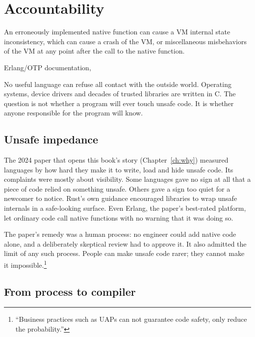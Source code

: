 \chapter{Accountability}
\label{ch:danger}

\epigraph{An erroneously implemented native function can cause a VM internal
state inconsistency, which can cause a crash of the VM, or miscellaneous
misbehaviors of the VM at any point after the call to the native function.}
{Erlang/OTP documentation, }

No useful language can refuse all contact with the outside world. Operating
systems, device drivers and decades of trusted libraries are written in C. The
question is not whether a program will ever touch unsafe code. It is whether
anyone responsible for the program will know.

\section{Unsafe impedance}

The 2024 paper that opens this book's story (Chapter~\ref{ch:why}) measured
languages by how hard they make it to write, load and hide unsafe code. Its
complaints were mostly about visibility. Some languages gave no sign at all
that a piece of code relied on something unsafe. Others gave a sign too quiet
for a newcomer to notice. Rust's own guidance encouraged libraries to wrap
unsafe internals in a safe-looking surface. Even Erlang, the paper's
best-rated platform, let ordinary code call native functions with no warning
that it was doing so.

The paper's remedy was a human process: no engineer could add native code
alone, and a deliberately skeptical review had to approve it. It also admitted
the limit of any such process. People can make unsafe code rarer; they cannot
make it impossible.\footnote{``Business practices such as UAPs can not
guarantee code safety, only reduce the probability.''}

\section{From process to compiler}

